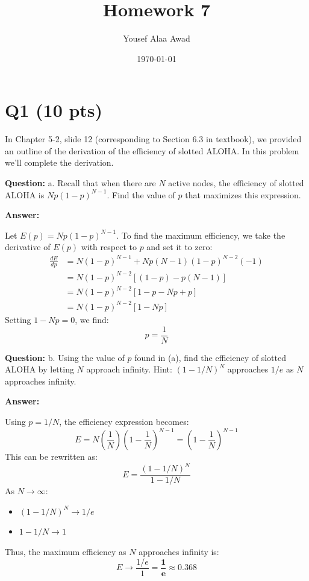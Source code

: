 \documentclass[12pt, letterpaper]{article}
\title{\textbf{Homework 7}}
\author{Yousef Alaa Awad}
\date{\today}
\newcommand{\question}[1]{\noindent\textbf{Question: }#1\par\vspace{0.5em}}
\newcommand{\answer}{\noindent\textbf{Answer:}\par\vspace{0.5em}}
\begin{document}
\maketitle

\section*{Q1 (10 pts)}

In Chapter 5-2, slide 12 (corresponding to Section 6.3 in textbook), we provided an outline of the derivation of the efficiency of slotted ALOHA. In this problem we'll complete the derivation.

\question{a. Recall that when there are $N$ active nodes, the efficiency of slotted ALOHA is $Np(1-p)^{N-1}$. Find the value of $p$ that maximizes this expression.}

\answer
Let $E(p) = Np(1-p)^{N-1}$. To find the maximum efficiency, we take the derivative of $E(p)$ with respect to $p$ and set it to zero:
\begin{align*}
\frac{dE}{dp} &= N(1-p)^{N-1} + Np(N-1)(1-p)^{N-2}(-1) \\
&= N(1-p)^{N-2} \left[ (1-p) - p(N-1) \right] \\
&= N(1-p)^{N-2} \left[ 1 - p - Np + p \right] \\
&= N(1-p)^{N-2} \left[ 1 - Np \right]
\end{align*}
Setting $1 - Np = 0$, we find:
\begin{equation*}
p = \frac{1}{N}
\end{equation*}

\question{b. Using the value of $p$ found in (a), find the efficiency of slotted ALOHA by letting $N$ approach infinity. Hint: $(1-1/N)^N$ approaches $1/e$ as $N$ approaches infinity.}

\answer
Using $p = 1/N$, the efficiency expression becomes:
\begin{equation*}
E = N\left(\frac{1}{N}\right)\left(1 - \frac{1}{N}\right)^{N-1} = \left(1 - \frac{1}{N}\right)^{N-1}
\end{equation*}
This can be rewritten as:
\begin{equation*}
E = \frac{(1 - 1/N)^N}{1 - 1/N}
\end{equation*}
As $N \to \infty$:
\begin{itemize}
    \item $(1 - 1/N)^N \to 1/e$
    \item $1 - 1/N \to 1$
\end{itemize}
Thus, the maximum efficiency as $N$ approaches infinity is:
\begin{equation*}
E \to \frac{1/e}{1} = \mathbf{\frac{1}{e}} \approx 0.368
\end{equation*}
\end{document}
